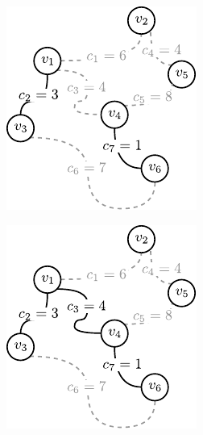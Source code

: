 \begin{figure}[!htbp]
\begin{subfigure}[b]{0.19\textwidth}
		\caption{}
		\label{fig:kruskal:b}
	\end{subfigure}
	\hfill
	\begin{subfigure}[b]{0.19\textwidth}
		\includegraphics[width=\textwidth]{Chapter_I/KRUSKAL-example/c}
		\caption{}
		\label{fig:kruskal:c}
	\end{subfigure}
	\hfill
	\begin{subfigure}[b]{0.19\textwidth}
		\includegraphics[width=\textwidth]{Chapter_I/KRUSKAL-example/d}

\end{subfigure}
\end{figure}
